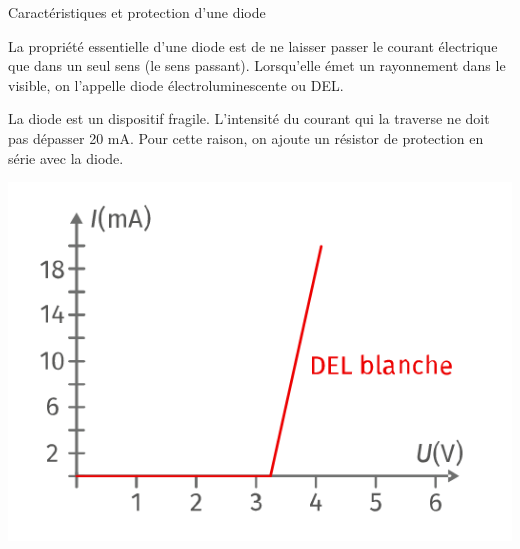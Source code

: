 \documentclass[10pt]{article}
\begin{document}
\begin{documentpeda}{Caractéristiques et protection d’une diode}
	\begin{minipage}[c]{0.75\textwidth}
		La propriété essentielle
		d’une diode est de ne laisser passer le courant électrique
		que dans un seul sens (le sens passant). Lorsqu’elle émet un
		rayonnement dans le visible, on l’appelle diode électroluminescente ou DEL.

		La diode est un dispositif fragile. L’intensité du courant qui la traverse ne doit pas dépasser 20 mA.
		Pour cette raison, on ajoute un résistor de protection en série avec la diode.
	\end{minipage}
	\hspace{0.05\textwidth}
	\begin{minipage}[c]{0.2\textwidth}
		\begin{center}
			\includegraphics[width=\columnwidth]{carac.png}
		\end{center}
	\end{minipage}
\end{documentpeda}

\vspace{-10pt}
\end{document}
